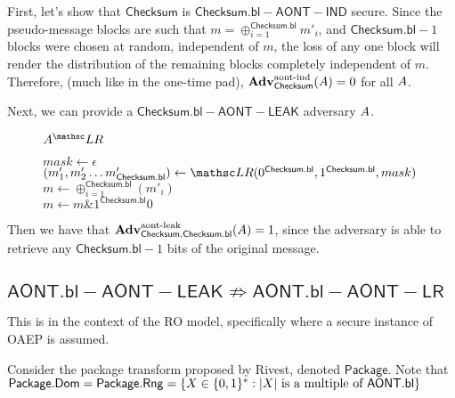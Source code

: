 \documentclass[11pt,twoside]{article}
\begin{document}
First, let's show that $\mathsf{Checksum}$ is $\mathsf{Checksum.bl-AONT-IND}$ secure. Since the pseudo-message blocks are such that $m=\oplus_{i=1}^\mathsf{Checksum.bl} m'_i$, and $\mathsf{Checksum.bl}-1$ blocks were chosen at random, independent of $m$, the loss of any one block will render the distribution of the remaining blocks completely independent of $m$. Therefore, (much like in the one-time pad), $\textbf{Adv}^\text{aont-ind}_{\mathsf{Checksum}}(A)=0$ for all $A$.

Next, we can provide a $\mathsf{Checksum.bl-AONT-LEAK}$ adversary $A$. 

\begin{figure}[H]
{
\underline{$\advA^\LRO$}

\begin{algorithm}[H]
$mask\gets \epsilon$ 
$(m'_1,m'_2\dots m'_\mathsf{Checksum.bl})\gets \LRO(0^\mathsf{Checksum.bl},1^\mathsf{Checksum.bl},mask)$\\
$m\gets \oplus_{i=1}^\mathsf{Checksum.bl}(m'_i)$\\
$m\gets m \mathrel{\&} 1^\mathsf{Checksum.bl}0$\\
\end{algorithm}
}
\end{figure}

Then we have that $\textbf{Adv}^\text{aont-leak}_{\mathsf{Checksum},\mathsf{Checksum.bl}}(A)=1$, since the adversary is able to retrieve any $\mathsf{Checksum.bl}-1$ bits of the original message. 

\subsection{$\mathsf{AONT.bl-AONT-LEAK}\not\Rightarrow \mathsf{AONT.bl-AONT-LR}$}

This is in the context of the RO model, specifically where a secure instance of OAEP is assumed.

Consider the package transform proposed by Rivest, denoted $\mathsf{Package}$. Note that $\mathsf{Package.Dom} = \mathsf{Package.Rng}=\{X\in\{0,1\}^* : |X| \text{ is a multiple of } \mathsf{AONT.bl}\}$
\end{document}
